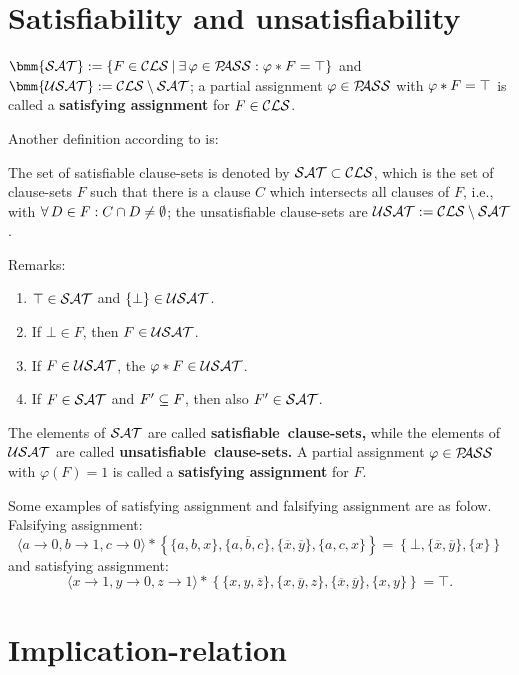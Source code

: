 \documentclass[]{book}
\begin{document}
\section{Satisfiability and unsatisfiability}
\label{sec:Satisfiability and Unsatisfiability}

\begin{defi}\label{def:sat}
      $\bmm{\Sat} := \set{F \in \Cls \mb \ex\, \vp \in \Pass : \vp * F = \top}$ and $\bmm{\Usat} := \Cls \sm \Sat$; a partial assignment 
	  $\varphi \in \mathcal{P\hspace{-0.32em}ASS}$ with $\varphi * F = \top$ is called a \textbf{satisfying assignment} for $F \in \mathcal{CLS}$.
\end{defi}
Another definition according to \cite{h12} is:
\begin{defi}\label{def:sat2}
The set of satisfiable clause-sets is denoted by $\mathcal{SAT} \subset \mathcal{CLS}$, which is the set of clause-sets $F$ such that there is a clause $C$ 
which intersects all clauses of $F$, i.e., with $\forall\, D \in F : C \cap D \ne \emptyset$; the unsatisfiable clause-sets are $\mathcal{USAT} := \mathcal{CLS} \setminus \mathcal{SAT}$.
\end{defi}
Remarks:
\begin{enumerate}
      \item $\top \in \mathcal{SAT}$ and $\{ \bot \} \in \mathcal{USAT}$.
      \item If $\bot \in F$, then $F \in \mathcal{USAT}$.
      \item If $F \in \mathcal{USAT}$, the $\varphi * F \in \mathcal{USAT}$.
      \item If $F \in \mathcal{SAT}$ and $F' \subseteq F$, then also $F' \in \mathcal{SAT}$.
\end{enumerate}
The elements of $\mathcal{SAT}$ are called \mbox{\textbf{satisfiable clause-sets,}}
while the elements of  $\mathcal{USAT}$ are called \mbox{\textbf{unsatisfiable clause-sets.}}
A partial assignment $\varphi \in \mathcal{P\hspace{-0.32em}ASS}$ with $\varphi(F) = 1$ is called a \textbf{satisfying assignment} for $F$.

\begin{examp}\label{exp:sat2}
      Some examples of satisfying assignment and  falsifying assignment are as folow.
      Falsifying assignment:
      $$\langle a\to 0, b\to 1, c\to 0 \rangle * \left\{\{a,b,x\}, \{a,\overline{b},c\}, \{\overline{x}, \overline{y}\}, \{a,c,x\} \right\} = \left\{\bot, \{\overline{x}, \overline{y}\}, \{x\}\right\}$$
      and satisfying assignment:
      $$\langle x\to 1, y\to 0, z\to 1 \rangle * \left\{\{x,y,\overline{z}\}, \{x,\overline{y},z\}, \{\overline{x}, \overline{y}\}, \{x,y\} \right\} = \top.$$
\end{examp}
\section{Implication-relation}
\label{sec:Implication-relation}
\end{document}

